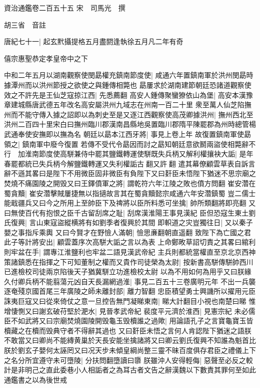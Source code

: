 資治通鑑卷二百五十五
宋　司馬光　撰

胡三省　音註

唐紀七十一|{
	起玄黓攝提格五月盡閼逢執徐五月凡二年有奇}


僖宗惠聖恭定孝皇帝中之下

中和二年五月以湖南觀察使閔勗權充鎮南節度使|{
	咸通六年置鎮南軍於洪州閔勗時據潭州而以洪州節授之欲使之與鍾傳相斃也}
勗屢求於湖南建節朝廷恐諸道觀察使效之不許先是王仙芝寇掠江西|{
	先悉薦翻}
高安人鍾傳聚蠻獠依山為堡|{
	高安本漢豫章建城縣唐武德五年改名高安屬洪州九域志在州南一百二十里}
衆至萬人仙芝陷撫州而不能守傳入據之詔即以為刺史至是又逐江西觀察使高茂卿據洪州|{
	撫州西北至洪州二百四十里宋白曰撫州臨川郡漢南昌縣地吳置臨川郡隋平陳罷郡為州時總管楊武通奉使安撫即以撫為名}
朝廷以勗本江西牙將|{
	事見上卷上年}
故復置鎮南軍使勗領之|{
	鎮南軍中廢今復置}
若傳不受代令勗因而討之勗知朝廷意欲鬭兩盜使相斃辭不行　加淮南節度使高駢兼侍中罷其鹽鐵轉運使駢既失兵柄又解利權攘袂大詬|{
	是年春罷都統已失兵柄今解鹽鐵轉運又失利權詬古翻又許翻}
遣其幕僚顧雲草表自訴言辭不遜其畧曰是陛下不用微臣固非微臣有負陛下又曰姧臣未悟陛下猶迷不思宗廟之焚燒不痛園陵之開毁又曰王鐸僨軍之將|{
	謂乾符六年江陵之敗也僨方問翻}
崔安濳在蜀貪黷|{
	崔安濳擊賊屢捷無以指擿故言其在蜀貪黷懿宗咸通六年安濳鎮蜀}
豈二儒士能戢疆兵又曰今之所用上至帥臣下及禆將以臣所料悉可坐擒|{
	帥所類翻將即亮翻}
又曰無使百代有抱恨之臣千古留刮席之耻|{
	刮席漢淮陽王事見漢紀}
臣但恐寇生東土劉氏復興|{
	言山東寇盜縱横將有如劉季者復興於其間}
即軹道之灾豈獨往日|{
	又以秦子嬰之事指斥乘輿}
又曰今賢才在野憸人滿朝|{
	憸思亷翻朝直遥翻}
致陛下為亡國之君此子等計將安出|{
	顧雲蓋序次高駢大詬之言以為表}
上命鄭畋草詔切責之其畧曰綰利則牢盆在手|{
	謂專江淮鹽利也牢盆二語見漢武帝紀}
主兵則都統當權直至京北京西神策諸鎮悉在指揮之下可知董制之權而又貴作司徒榮為太尉|{
	按新書高駢傳駢帥西川已進檢校司徒兩京陷後天子猶冀駢立功進檢校太尉}
以為不用如何為用乎又曰朕緣久付卿兵柄不能翦蕩元凶自天長漏網過淮|{
	事見二百五十三卷廣明元年}
不出一兵襲逐奄殘京國首尾三年廣陵之師未離封部|{
	離力智翻}
忠臣積望勇士興譏所以擢用元臣誅夷巨寇又曰從來倚仗之意一旦控告無門凝睇東南|{
	睇大計翻目小視也南楚曰睇}
惟增悽惻又曰謝玄破苻堅於淝水|{
	見晉孝武帝紀}
裴度平元濟於淮西|{
	見憲宗紀}
未必儒臣不如武將又曰宗廟焚燒園陵開毁龜玉毁櫝誰之過歟|{
	用論語孔子之言寶龜寶玉皆櫝藏之在櫝而毁典守者不得辭其過也}
又曰姧臣未悟之言何人肯認陛下猶迷之語朕不敢當又曰卿尚不能縳黄巢於天長安能坐擒諸將又曰卿云劉氏復興不知誰為魁首比朕於劉玄子嬰何太誣罔又曰况天步未傾皇綱尚整三靈不昧百度俱存君臣之禮儀上下之名分所宜遵守未可墮陵|{
	分扶問翻墮讀曰隳}
朕雖沖人安得輕侮|{
	惡聲至必反之較計是非明己之直此委巷小人相詬者之為耳古者文告之辭漢魏以下數責其罪何至如此通鑑書之以為後世戒}
